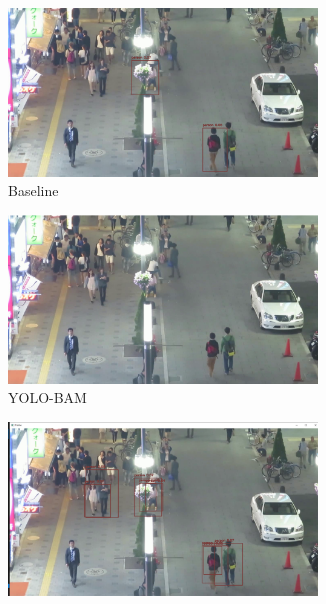 \begin{figure}[!htbp]
\centering
\begin{subfigure}{.25\textwidth}
  \centering
  \includegraphics[width=0.9\textwidth]{images/base_MOT-04.png}
  \caption{Baseline}
  \label{fig:baseMOT-04}
\end{subfigure}%
\begin{subfigure}{.25\textwidth}
  \centering
  \includegraphics[width=0.9\textwidth]{images/CBAM_MOT-04.png}
  \caption{YOLO-BAM}
  \label{fig:cbamMOT-04}
\end{subfigure}%
\begin{subfigure}{.25\textwidth}
  \centering
  \includegraphics[width=0.9\textwidth]{images/DSC_MOT-04.png}

\end{subfigure}
\end{figure}
